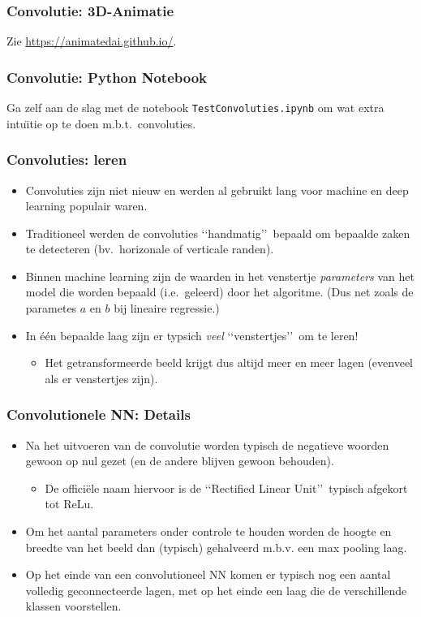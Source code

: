\documentclass[aspectratio=169]{beamer}
\begin{document}
\begin{frame}
\frametitle{Convolutie: 3D-Animatie}
Zie \url{https://animatedai.github.io/}.
\end{frame}

\begin{frame}
\frametitle{Convolutie: Python Notebook}
Ga zelf aan de slag met de notebook \texttt{TestConvoluties.ipynb} om 
wat extra intu\"{\i}tie op te doen m.b.t.\ convoluties.
\end{frame}


\begin{frame}
\frametitle{Convoluties: leren}

\begin{itemize}
\item Convoluties zijn niet nieuw en werden al gebruikt lang voor machine en deep learning populair waren.
\item Traditioneel werden de convoluties \lq\lq handmatig\rq\rq\ bepaald om bepaalde zaken te detecteren
(bv.\ horizonale of verticale randen).
\item Binnen machine learning zijn de waarden in het venstertje \emph{parameters}\/ van het model 
die worden bepaald (i.e.\ geleerd) door het algoritme. 
(Dus net zoals de parametes $a$ en $b$ bij lineaire regressie.)
\item In \'e\'en bepaalde laag zijn er typsich \emph{veel} \lq\lq venstertjes\rq\rq\ om te leren!
\begin{itemize}
	\item Het getransformeerde beeld krijgt dus altijd meer en meer lagen (evenveel als er venstertjes zijn).
\end{itemize}

\end{itemize}
\end{frame}

\begin{frame}
\frametitle{Convolutionele NN: Details}
\begin{itemize}
\item Na het uitvoeren van de convolutie worden typisch de negatieve woorden gewoon op nul gezet 
(en de andere blijven gewoon behouden).
\begin{itemize}
	\item De offici\"ele naam hiervoor is de \lq\lq Rectified Linear Unit\rq\rq\, typisch afgekort tot ReLu.
\end{itemize}		
\item Om het aantal parameters onder controle te houden worden de hoogte en breedte van het beeld 
dan (typisch) gehalveerd m.b.v. een max pooling laag.
\item Op het einde van een convolutioneel NN komen er typisch nog een aantal volledig geconnecteerde lagen, 
met op het einde een laag die de verschillende klassen voorstellen.
\end{itemize}
\end{frame}
\end{document}
